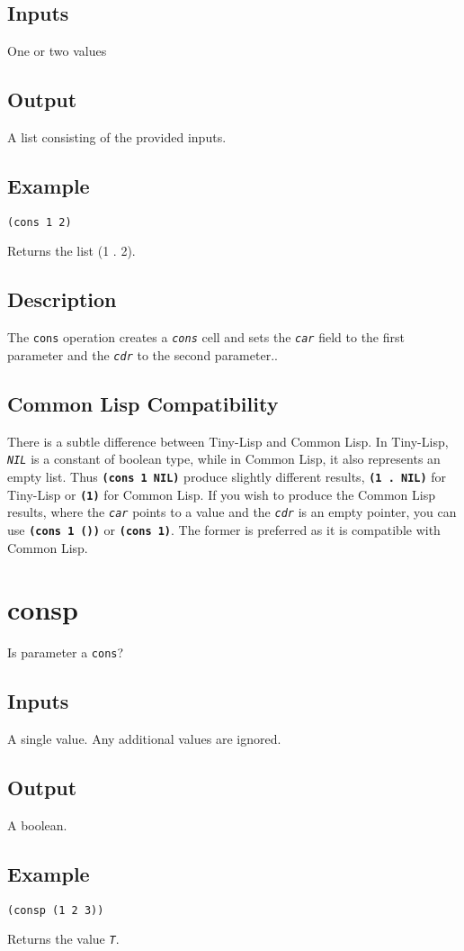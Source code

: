\documentclass[10pt, openany]{book}
\newcommand{\operation}[1]{\textbf{\texttt{#1}}}
\newcommand{\function}[1]{\texttt{#1}}
\newcommand{\constant}[1]{\emph{\texttt{#1}}}
\newcommand{\datatype}[1]{\texttt{#1}}
\newcommand{\tl}{Tiny-Lisp}
\newcommand{\cl}{Common Lisp}
\begin{document}
\subsection{Inputs}
One or two values
\subsection{Output}
A list consisting of the provided inputs.
\subsection{Example}
\begin{lstlisting}
(cons 1 2)
\end{lstlisting}
Returns the list (1 . 2).
\subsection{Description}
The \function{cons} operation creates a \constant{cons} cell and sets the \constant{car} field to the first parameter and the \constant{cdr} to the second parameter..
\subsection{Common Lisp Compatibility}
There is a subtle difference between \tl{} and \cl.  In \tl, \constant{NIL} is a constant of boolean type, while in \cl, it also represents an empty list.  Thus \operation{(cons 1 NIL)} produce slightly different results, \operation{(1 . NIL)} for \tl{} or \operation{(1)} for \cl.  If you wish to produce the \cl{} results, where the \constant{car} points to a value and the \constant{cdr} is an empty pointer, you can use \operation{(cons 1 ())} or \operation{(cons 1)}.  The former is preferred as it is compatible with \cl.

\section{consp}
Is parameter a \datatype{cons}?
\subsection{Inputs}
A single value.  Any additional values are ignored.
\subsection{Output}
A boolean.
\subsection{Example}
\begin{lstlisting}
(consp (1 2 3))
\end{lstlisting}
Returns the value \constant{T}.
\end{document}
